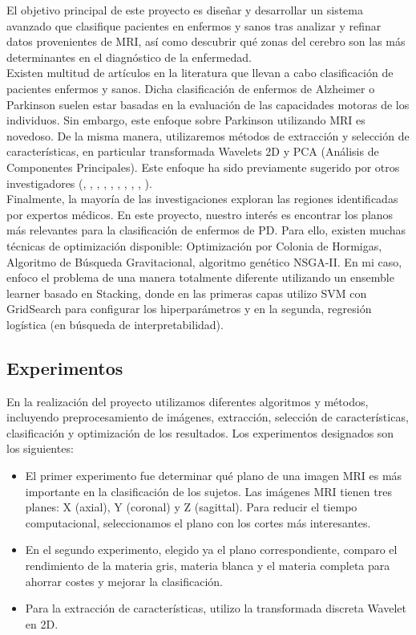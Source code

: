 El objetivo principal de este proyecto es diseñar y desarrollar un sistema avanzado que clasifique pacientes en enfermos y sanos tras analizar y refinar datos provenientes de MRI, así como descubrir qué zonas del cerebro son las más determinantes en el diagnóstico de la enfermedad. \\

Existen multitud de artículos en la literatura que llevan a cabo clasificación de pacientes enfermos y sanos. Dicha clasificación de enfermos de Alzheimer o Parkinson suelen estar basadas en la evaluación de las capacidades motoras de los individuos. Sin embargo, este enfoque sobre Parkinson utilizando MRI es novedoso. De la misma manera, utilizaremos métodos de extracción y selección de características, en particular transformada Wavelets 2D y PCA (Análisis de Componentes Principales). Este enfoque ha sido previamente sugerido por otros investigadores (\cite{aggarwal}, \cite{iman}, \cite{deepa}, \cite{mohd}, \cite{rajesh}, \cite{michel}, \cite{jing}, \cite{yudong}, \cite{irojas}, \cite{alberto}). \\

Finalmente, la mayoría de las investigaciones exploran las regiones identificadas por expertos médicos. En este proyecto, nuestro interés es encontrar los planos más relevantes para la clasificación de enfermos de PD. Para ello, existen muchas técnicas de optimización disponible: Optimización por Colonia de Hormigas, Algoritmo de Búsqueda Gravitacional, algoritmo genético NSGA-II. En mi caso, enfoco el problema de una manera totalmente diferente utilizando un ensemble learner basado en Stacking, donde en las primeras capas utilizo SVM con GridSearch para configurar los hiperparámetros y en la segunda, regresión logística (en búsqueda de interpretabilidad).

\subsection{Experimentos}

En la realización del proyecto utilizamos diferentes algoritmos y métodos, incluyendo preprocesamiento de imágenes, extracción, selección de características, clasificación y optimización de los resultados. Los experimentos designados son los siguientes:

\begin{itemize}
	\item El primer experimento fue determinar qué plano de una imagen MRI es más importante en la clasificación de los sujetos. Las imágenes MRI tienen tres planes: X (axial), Y (coronal) y Z (sagittal). Para reducir el tiempo computacional, seleccionamos el plano con los cortes más interesantes.
	
	\item En el segundo experimento, elegido ya el plano correspondiente, comparo el rendimiento de la materia gris, materia blanca y el materia completa para ahorrar costes y mejorar la clasificación.
	
	\item Para la extracción de características, utilizo la transformada discreta Wavelet en 2D.
	
\end{itemize}


